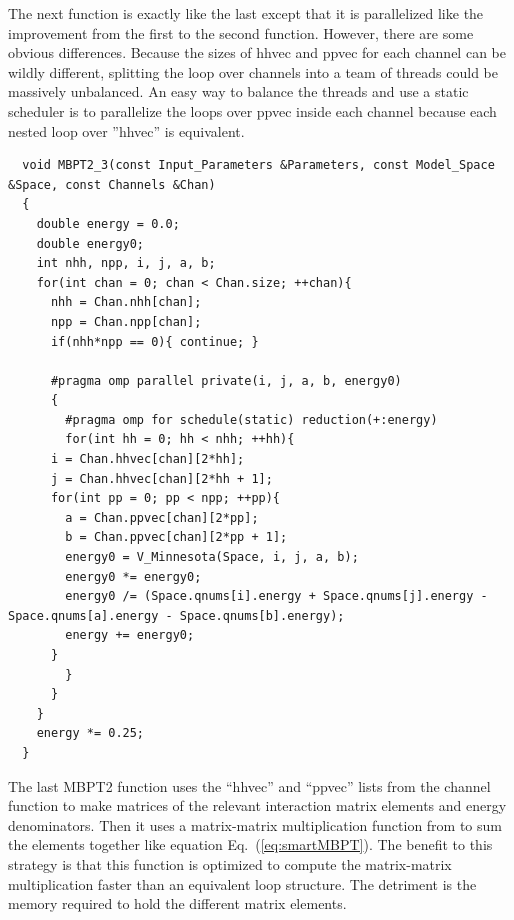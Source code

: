 The next function is exactly like the last except that it is parallelized like the improvement from the first to the second function. However, there are some obvious differences. Because the sizes of hhvec and ppvec for each channel can be wildly different, splitting the loop over channels into a team of threads could be massively unbalanced. An easy way to balance the threads and use a static scheduler is to parallelize the loops over ppvec inside each channel because each nested loop over ''hhvec'' is equivalent.

\begin{lstlisting}
  void MBPT2_3(const Input_Parameters &Parameters, const Model_Space &Space, const Channels &Chan)
  {
    double energy = 0.0;
    double energy0;
    int nhh, npp, i, j, a, b;
    for(int chan = 0; chan < Chan.size; ++chan){
      nhh = Chan.nhh[chan];
      npp = Chan.npp[chan];
      if(nhh*npp == 0){ continue; }
      
      #pragma omp parallel private(i, j, a, b, energy0)
      {
        #pragma omp for schedule(static) reduction(+:energy)
        for(int hh = 0; hh < nhh; ++hh){
	  i = Chan.hhvec[chan][2*hh];
	  j = Chan.hhvec[chan][2*hh + 1];
	  for(int pp = 0; pp < npp; ++pp){
	    a = Chan.ppvec[chan][2*pp];
	    b = Chan.ppvec[chan][2*pp + 1];
	    energy0 = V_Minnesota(Space, i, j, a, b);
	    energy0 *= energy0;
	    energy0 /= (Space.qnums[i].energy + Space.qnums[j].energy - Space.qnums[a].energy - Space.qnums[b].energy);
	    energy += energy0;
	  }
        }
      }
    }
    energy *= 0.25;
  }
\end{lstlisting}

The last MBPT2 function uses the ``hhvec'' and ``ppvec'' lists from the channel function to make matrices of the relevant interaction matrix elements and energy denominators. Then it uses a matrix-matrix multiplication function from \cite{blas} to sum the elements together like equation Eq.~(\ref{eq:smartMBPT}). The benefit to this strategy is that this function is optimized to compute the matrix-matrix multiplication faster than an equivalent loop structure. The detriment is the memory required to hold the different matrix elements.


